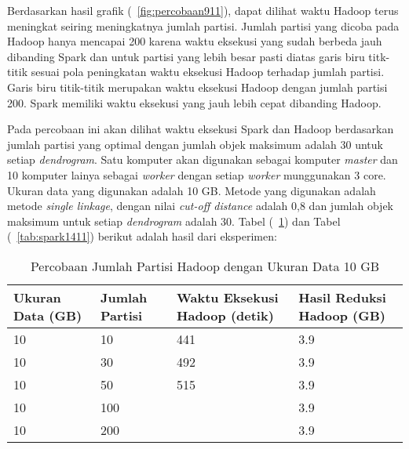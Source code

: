 Berdasarkan hasil grafik (~\ref{fig:percobaan911}), dapat dilihat waktu Hadoop terus meningkat seiring meningkatnya jumlah partisi. Jumlah partisi yang dicoba pada Hadoop hanya mencapai 200 karena waktu eksekusi yang sudah berbeda jauh dibanding Spark dan untuk partisi yang lebih besar pasti diatas garis biru titk-titik sesuai pola peningkatan waktu eksekusi Hadoop terhadap jumlah partisi. Garis biru titik-titik merupakan waktu eksekusi Hadoop dengan jumlah partisi 200. Spark memiliki waktu eksekusi yang jauh lebih cepat dibanding Hadoop.  



Pada percobaan ini akan dilihat waktu eksekusi Spark dan Hadoop berdasarkan jumlah partisi yang optimal dengan jumlah objek maksimum adalah 30 untuk setiap \textit{dendrogram}. Satu komputer akan digunakan sebagai komputer \textit{master} dan 10 komputer lainya sebagai \textit{worker} dengan setiap \textit{worker} munggunakan 3 core. Ukuran data yang digunakan adalah 10 GB. Metode yang digunakan adalah metode \textit{single linkage}, dengan nilai \textit{cut-off distance} adalah 0,8 dan jumlah objek maksimum untuk setiap \textit{dendrogram} adalah 30. Tabel (~\ref{tab:spark1311}) dan Tabel (~\ref{tab:spark1411}) berikut adalah hasil dari eksperimen:





\begin{table}[H] 
	\centering 
	\caption{Percobaan Jumlah Partisi Hadoop dengan Ukuran Data 10 GB}
	\label{tab:spark1311}
	\begin{tabular}{|p{3cm}|p{3cm}|p{4cm}|p{4cm}|}
\hline
Ukuran Data (GB) & Jumlah Partisi &  Waktu Eksekusi Hadoop (detik) & Hasil Reduksi Hadoop (GB)\\
\hline
10 & 10 & 441  & 3.9  \\
\hline
10 & 30 & 492  & 3.9  \\
\hline
10 & 50 & 515  & 3.9   \\
\hline
10 & 100 &   & 3.9   \\
\hline
10 & 200 &   & 3.9   \\
\hline


\hline

	\end{tabular} 
\end{table}




